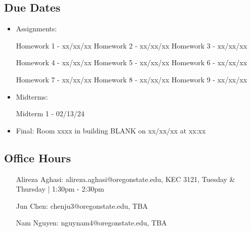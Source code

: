\documentclass[11pt,fleqn,openany]{book} %
\begin{document}
\subsection{Due Dates}
\begin{itemize}
  \item Assignments:

    Homework 1 - xx/xx/xx  \hspace{3 mm}  Homework 2 - xx/xx/xx \hspace{3 mm} Homework 3 - xx/xx/xx

    Homework 4 - xx/xx/xx \hspace{3 mm}  Homework 5 - xx/xx/xx \hspace{3 mm} Homework 6 - xx/xx/xx 

    Homework 7 - xx/xx/xx \hspace{3 mm}  Homework 8 - xx/xx/xx \hspace{3 mm} Homework 9 - xx/xx/xx 
\\ 

  \item Midterms:

    Midterm 1 - 02/13/24
\\
  \item Final:
    Room xxxx in building BLANK on xx/xx/xx at xx:xx 
\\
\end{itemize}

\subsection{Office Hours}
\begin{itemize}[leftmargin=1cm]
  \item[Alireza Aghasi:]  alireza.aghasi@oregonstate.edu, KEC 3121, Tuesday \& Thursday | 1:30pm - 2:30pm 
\item[Jun Chen:] chenju3@oregonstate.edu, TBA
\item[Nam Nguyen:] nguynam4@oregonstate.edu, TBA
\end{itemize}
\end{document}
